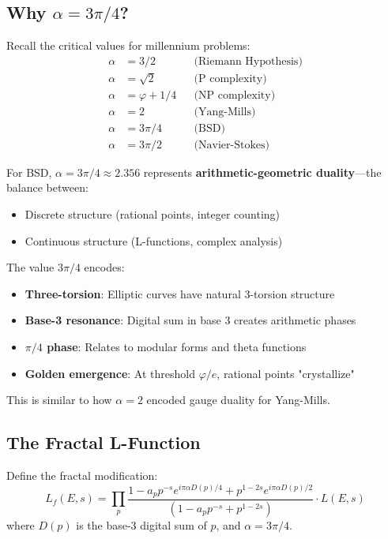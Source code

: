 \subsection{Why \texorpdfstring{$\alpha = 3\pi/4$}{alpha = 3pi/4}?}

Recall the critical values for millennium problems:
\begin{align}
\alpha &= 3/2 && \text{(Riemann Hypothesis)} \\
\alpha &= \sqrt{2} && \text{(P complexity)} \\
\alpha &= \varphi + 1/4 && \text{(NP complexity)} \\
\alpha &= 2 && \text{(Yang-Mills)} \\
\alpha &= 3\pi/4 && \text{(BSD)} \\
\alpha &= 3\pi/2 && \text{(Navier-Stokes)}
\end{align}

For BSD, $\boxed{\alpha = 3\pi/4 \approx 2.356}$ represents \textbf{arithmetic-geometric duality}---the balance between:
\begin{itemize}
\item Discrete structure (rational points, integer counting)
\item Continuous structure (L-functions, complex analysis)
\end{itemize}

\begin{keyidea}
The value $3\pi/4$ encodes:
\begin{itemize}
\item \textbf{Three-torsion}: Elliptic curves have natural 3-torsion structure
\item \textbf{Base-3 resonance}: Digital sum in base 3 creates arithmetic phases
\item \textbf{$\pi/4$ phase}: Relates to modular forms and theta functions
\item \textbf{Golden emergence}: At threshold $\varphi/e$, rational points "crystallize"
\end{itemize}

This is similar to how $\alpha = 2$ encoded gauge duality for Yang-Mills.
\end{keyidea}

\subsection{The Fractal L-Function}

\begin{defn}\label{def:fractal-l-function}
Define the fractal modification:
\begin{equation}
L_f(E,s) = \prod_p \frac{1 - a_p p^{-s} e^{i\pi\alpha D(p)/4} + p^{1-2s} e^{i\pi\alpha D(p)/2}}{(1 - a_p p^{-s} + p^{1-2s})}
\cdot L(E,s)
\end{equation}
where $D(p)$ is the base-3 digital sum of $p$, and $\alpha = 3\pi/4$.
\end{defn}

